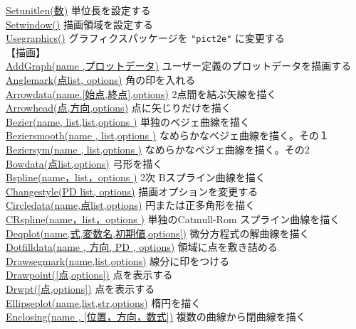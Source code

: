 \documentclass[papersize,a4paper,12pt,uplatex]{jsarticle}
\begin{document}
\begin{tabbing}
\hyperlink{setunitlen}{Setunitlen(数)}    \>単位長を設定する\\
\hyperlink{setwindow}{Setwindow()}  \>描画領域を設定する\\
\hyperlink{usegraphics}{Usegraphics()} \>グラフィクスパッケージを  \verb|"pict2e"| に変更する\\
【描画】\\
\hyperlink{addgraph}{AddGraph(name ,プロットデータ)} \>ユーザー定義のプロットデータを描画する\\
\hyperlink{anglemark}{Anglemark(点list, options)}  \>角の印を入れる\\
\hyperlink{arrowdata}{Arrowdata(name.[始点,終点],options)}  \>2点間を結ぶ矢線を描く\\
\hyperlink{arrowhead}{Arrowhead(点,方向,options)}  \>点に矢じりだけを描く\\
\hyperlink{bezier}{Bezier(name, list,list,options )} \>単独のベジェ曲線を描く\\
\hyperlink{beziersmooth}{Beziersmooth(name , list,options )} \>なめらかなベジェ曲線を描く。その１\\
\hyperlink{beziersym}{Beziersym(name , list,options )} \>なめらかなベジェ曲線を描く。その2\\
\hyperlink{bowdata}{Bowdata(点list,options)}  \>弓形を描く\\
\hyperlink{bspline}{Bspline(name，list，options )}   \>2次 Bスプライン曲線を描く\\
\hyperlink{changestyle}{Changestyle(PD list, options)} \>描画オプションを変更する\\
\hyperlink{circledata}{Circledata(name,点list,options)}  \>円または正多角形を描く\\
\hyperlink{crspline}{CRspline(name，list，options )} \>単独のCatmull-Rom スプライン曲線を描く\\
\hyperlink{deqplot}{Deqplot(name,式,変数名,初期値,options])}  \>微分方程式の解曲線を描く\\
\hyperlink{dotfilldata}{Dotfilldata(name , 方向, PD , options)}    \>領域に点を敷き詰める\\
\hyperlink{drawsegmark}{Drawsegmark(name,list,options)}  \>線分に印をつける\\
\hyperlink{drwpt}{Drawpoint([点,options])}  \>点を表示する\\
\hyperlink{drwpt}{Drwpt([点,options])}      \>点を表示する\\
\hyperlink{ellipseplot}{Ellipseplot(name,list,str,options)}  \>楕円を描く\\
\hyperlink{enclosing}{Enclosing(name , [位置，方向，数式])}  \>複数の曲線から閉曲線を描く\\

\end{tabbing}
\end{document}

